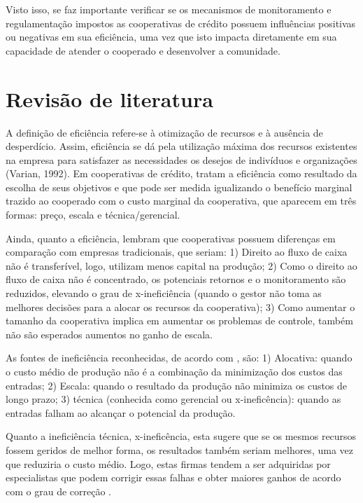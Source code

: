 \documentclass[ppgcc]{fearp}
\begin{document}
Visto isso, se faz importante verificar se os mecanismos de monitoramento e regulamentação impostos as cooperativas de crédito possuem influências positivas ou negativas em sua eficiência, uma vez que isto impacta diretamente em sua capacidade de atender o cooperado e desenvolver a comunidade.

\section{Revisão de literatura}

A definição de eficiência refere-se à otimização de recursos e à ausência de desperdício. Assim, eficiência se dá pela utilização máxima dos recursos existentes na empresa para satisfazer as necessidades os desejos de indivíduos e organizações (Varian, 1992). Em cooperativas de crédito,  tratam a eficiência como resultado da escolha de seus objetivos e que pode ser medida igualizando o benefício marginal trazido ao cooperado com o custo marginal da cooperativa, que aparecem em três formas: preço, escala e técnica/gerencial. 

Ainda, quanto a eficiência, lembram que cooperativas possuem diferenças em comparação com empresas tradicionais, que seriam: 1) Direito ao fluxo de caixa não é transferível, logo, utilizam menos capital na produção; 2) Como o direito ao fluxo de caixa não é concentrado, os potenciais retornos e o monitoramento são reduzidos, elevando o grau de x-ineficiência (quando o gestor não toma as melhores decisões para a alocar os recursos da cooperativa); 3) Como aumentar o tamanho da cooperativa implica em aumentar os problemas de controle, também não são esperados aumentos no ganho de escala.

As fontes de ineficiência reconhecidas, de acordo com , são: 1) Alocativa: quando o custo médio de produção não é a combinação da minimização dos custos das entradas; 2) Escala: quando o resultado da produção não minimiza os custos de longo prazo; 3) técnica (conhecida como gerencial ou x-ineficência): quando as entradas falham ao alcançar o potencial da produção. 

Quanto a ineficiência técnica, x-ineficência, esta sugere que se os mesmos recursos fossem geridos de melhor forma, os resultados também seriam melhores, uma vez que reduziria o custo médio. Logo, estas firmas tendem a ser adquiridas por especialistas que podem corrigir essas falhas e obter maiores ganhos de acordo com o grau de correção \cite{leibenstein1978, porterscully1987}.
\end{document}
